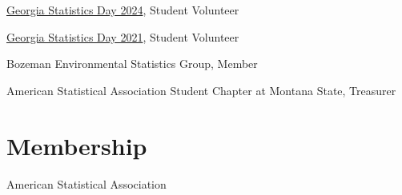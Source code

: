 \documentclass{wm_cv}
\begin{document}
\href{https://www.niss.org/events/georgia-statistics-day-2024}{Georgia Statistics Day 2024}, Student Volunteer \hfill  {}

\href{https://www.stat.uga.edu/events/content/2021/georgia-statistics-day-2021}{Georgia Statistics Day 2021}, Student Volunteer \hfill  {}

Bozeman Environmental Statistics Group, Member \hfill  {}

American Statistical Association Student Chapter at Montana State, Treasurer \hfill  {}

\section{Membership}

American Statistical Association \\
\end{document}

